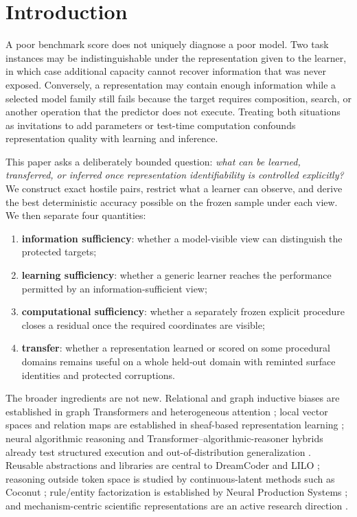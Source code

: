 \section{Introduction}

A poor benchmark score does not uniquely diagnose a poor model. Two task instances may be indistinguishable under the representation given to the learner, in which case additional capacity cannot recover information that was never exposed. Conversely, a representation may contain enough information while a selected model family still fails because the target requires composition, search, or another operation that the predictor does not execute. Treating both situations as invitations to add parameters or test-time computation confounds representation quality with learning and inference.

This paper asks a deliberately bounded question: \emph{what can be learned, transferred, or inferred once representation identifiability is controlled explicitly?} We construct exact hostile pairs, restrict what a learner can observe, and derive the best deterministic accuracy possible on the frozen sample under each view. We then separate four quantities:
\begin{enumerate}
    \item \textbf{information sufficiency}: whether a model-visible view can distinguish the protected targets;
    \item \textbf{learning sufficiency}: whether a generic learner reaches the performance permitted by an information-sufficient view;
    \item \textbf{computational sufficiency}: whether a separately frozen explicit procedure closes a residual once the required coordinates are visible;
    \item \textbf{transfer}: whether a representation learned or scored on some procedural domains remains useful on a whole held-out domain with reminted surface identities and protected corruptions.
\end{enumerate}

The broader ingredients are not new. Relational and graph inductive biases are established in graph Transformers and heterogeneous attention \citep{ying2021graphormer,hu2020hgt,rampasek2022gps}; local vector spaces and relation maps are established in sheaf-based representation learning \citep{gebhart2021knowledge,bodnar2022sheaf}; neural algorithmic reasoning and Transformer--algorithmic-reasoner hybrids already test structured execution and out-of-distribution generalization \citep{velickovic2022clrs,bounsi2024transnar}. Reusable abstractions and libraries are central to DreamCoder and LILO \citep{ellis2020dreamcoder,grand2023lilo}; reasoning outside token space is studied by continuous-latent methods such as Coconut \citep{hao2024coconut}; rule/entity factorization is established by Neural Production Systems \citep{goyal2021nps}; and mechanism-centric scientific representations are an active research direction \citep{posner2026mwm}.

